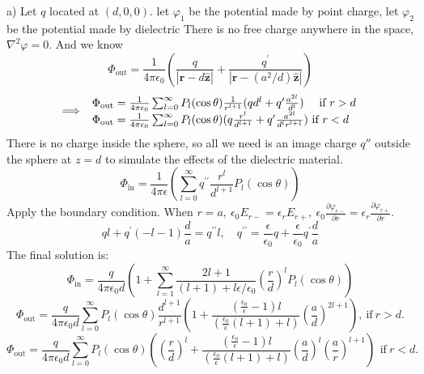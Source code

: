 \documentclass[UTF8,9pt]{ctexart}
\begin{document}
a) Let $q$ located at $(d,0,0)$. let $\varphi_{1} $ be the potential made by point charge, let $\varphi_{2} $ be the potential made by dielectric %
There is no free charge anywhere in the space, $\nabla^2\varphi=0$.
And we know
$$ 
\Phi_{\mathrm{out}}=\frac{1}{4 \pi \epsilon_{0}}(\frac{q}{|\mathbf{r}-d \hat{\mathbf{z}}|}+\frac{q^{\prime}}{|\mathbf{r}-(a^{2} / d) \hat{\mathbf{z}}|})
 $$
 $$ 
\implies \begin{array}{l}{\Phi_{\mathrm{out}}=\frac{1}{4 \pi \epsilon_{0}} \sum_{l=0}^{\infty} P_{l}(\cos \theta) \frac{1}{r^{l+1}}(q d^{l}+q^{\prime} \frac{a^{2 l}}{d^{l}}) \quad \text { if } r>d} \\ {\Phi_{\mathrm{out}}=\frac{1}{4 \pi \epsilon_{0}} \sum_{l=0}^{\infty} P_{l}(\cos \theta)(q \frac{r^{l}}{d^{l+1}}+q^{\prime} \frac{a^{2 l}}{d^{l} r^{l+1}}) \text { if } r<d}\end{array}
 $$
 There is no charge inside the sphere, so all we need is an image charge $q''$ outside the sphere at $z = d$ to simulate the effects of the dielectric material. 
 $$ 
\Phi_{\mathrm{in}}=\frac{1}{4 \pi \epsilon}(\sum_{l=0}^{\infty} q^{\prime \prime} \frac{r^{l}}{d^{l+1}} P_{l}(\cos \theta))
 $$
 Apply the boundary condition. When $r=a,\ \epsilon_0E_{r-}=\epsilon_rE_{r+},\ \epsilon_{0} \frac{\partial \varphi_{r-}}{\partial r}=\epsilon_r \frac{\partial \varphi_{r+}}{\partial r} $.
 $$ 
q l+q^{\prime}(-l-1) \frac{d}{a}=q^{\prime \prime} l,\quad q^{\prime \prime}=\frac{\epsilon}{\epsilon_{0}} q+\frac{\epsilon}{\epsilon_{0}} q^{\prime} \frac{d}{a}
 $$
The final solution is:
$$ 
\Phi_{\mathrm{in}}=\frac{q}{4 \pi \epsilon_{0} d}(1+\sum_{l=1}^{\infty} \frac{2 l+1}{(l+1)+l \epsilon / \epsilon_{0}}(\frac{r}{d})^{l} P_{l}(\cos \theta))
 $$
 $$ 
\Phi_{\mathrm{out}}=\frac{q}{4 \pi \epsilon_{0} d} \sum_{l=0}^{\infty} P_{l}(\cos \theta) \frac{d^{l+1}}{r^{l+1}}(1+\frac{(\frac{\epsilon_{0}}{\epsilon}-1) l}{(\frac{\epsilon_{0}}{\epsilon}(l+1)+l)}(\frac{a}{d})^{2 l+1}),\ \text{if}\ r>d.
 $$
 $$ 
\Phi_{\mathrm{out}}=\frac{q}{4 \pi \epsilon_{0} d} \sum_{l=0}^{\infty} P_{l}(\cos \theta)((\frac{r}{d})^{l}+\frac{(\frac{\epsilon_{0}}{\epsilon}-1) l}{(\frac{\epsilon_{0}}{\epsilon}(l+1)+l)}(\frac{a}{d})^{l}(\frac{a}{r})^{l+1})\,\ \text{if}\ r<d.
 $$
\end{document}
